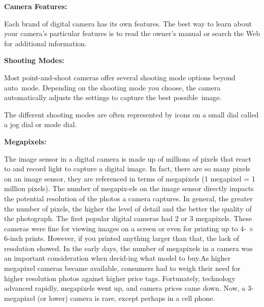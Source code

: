 \documentclass{report}
\begin{document}
    \bigbreak \noindent 
    \begin{Large}
        \textbf{Camera Features:}
    \end{Large}
    
    \bigbreak \noindent 
    Each brand of digital camera has its own features. The best way to learn about your camera’s particular features is to read the owner’s manual or search the Web for additional information.

    \bigbreak \noindent \bigbreak \noindent 
    \begin{Large}
        \textbf{Shooting Modes:}
    \end{Large}

    \bigbreak \noindent 
    Most point-and-shoot cameras offer several shooting mode options beyond auto mode. Depending on the shooting mode you choose, the camera automatically adjusts the settings to capture the best possible image.

    \bigbreak \noindent 
    The different shooting modes are often represented by icons on a small dial called a jog dial or mode dial.

    \pagebreak
    \begin{Large}
        \noindent \textbf{Megapixels:}
    \end{Large}

    \bigbreak \noindent 
    The image sensor in a digital camera is made up of millions of pixels that react to and record light to capture a digital image. In fact, there are so many pixels on an image sensor, they are referenced in terms of megapixels (1 megapixel = 1 million pixels). The number of megapix-els on the image sensor directly impacts the potential resolution of the photos a camera captures. In general, the greater the number of pixels, the higher the level of detail and the better the quality of the photograph. The first popular digital cameras had 2 or 3 megapixels. These cameras were fine for viewing images on a screen or even for printing up to 4- × 6-inch prints. However, if you printed anything larger than that, the lack of resolution showed. In the early days, the number of megapixels in a camera was an important consideration when decid-ing what model to buy.As higher megapixel cameras became available, consumers had to weigh their need for higher resolution photos against higher price tags. Fortunately, technology advanced rapidly, megapixels went up, and camera prices came down. Now, a 3-megapixel (or lower) camera is rare, except perhaps in a cell phone.
\end{document}
